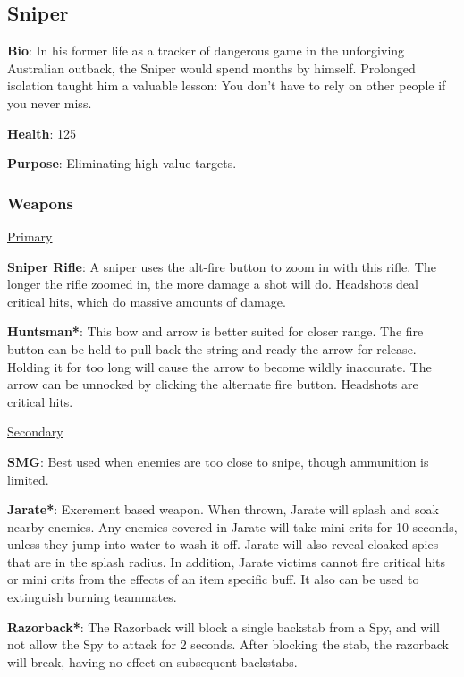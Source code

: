\subsection{Sniper}
{\bf Bio}:
In his former life as a tracker of dangerous game in the unforgiving Australian outback, the Sniper would spend months by himself. Prolonged isolation taught him a valuable lesson: You don't have to rely on other people if you never miss.

{\bf Health}: 125

{\bf Purpose}:
Eliminating high-value targets.

\subsubsection {Weapons}

\begin {center}
\underline {Primary}
\end {center}

{\bf Sniper Rifle}: A sniper uses the alt-fire button to zoom in with this rifle. The longer the rifle zoomed in, the more damage a shot will do. Headshots deal critical hits, which do massive amounts of damage.

{\bf Huntsman*}: This bow and arrow is better suited for closer range. The fire button can be held to pull back the string and ready the arrow for release. Holding it for too long will cause the arrow to become wildly inaccurate. The arrow can be unnocked by clicking the alternate fire button. Headshots are critical hits.

\begin {center}
\underline {Secondary}
\end {center}

{\bf SMG}: Best used when enemies are too close to snipe, though ammunition is limited.

{\bf Jarate*}: Excrement based weapon. When thrown, Jarate will splash and soak nearby enemies. Any enemies covered in Jarate will take mini-crits for 10 seconds, unless they jump into water to wash it off. Jarate will also reveal cloaked spies that are in the splash radius. In addition, Jarate victims cannot fire critical hits or mini crits from the effects of an item specific buff. It also can be used to extinguish burning teammates. 

{\bf Razorback*}: The Razorback will block a single backstab from a Spy, and will not allow the Spy to attack for 2 seconds. After blocking the stab, the razorback will break, having no effect on subsequent backstabs.


